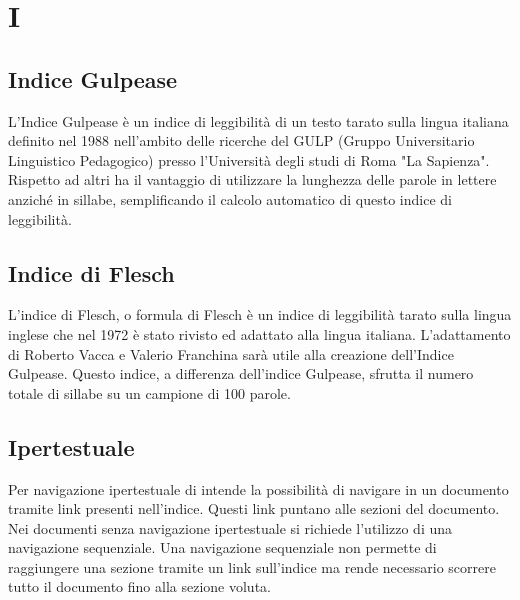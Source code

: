 \section{I}

    \subsection*{Indice Gulpease}

        L'Indice Gulpease è un indice di leggibilità di un testo tarato sulla lingua italiana definito nel 1988
        nell'ambito delle ricerche del GULP (Gruppo Universitario Linguistico Pedagogico) presso l'Università degli
        studi di Roma "La Sapienza". Rispetto ad altri ha il vantaggio di utilizzare la lunghezza delle parole in
        lettere anziché in sillabe, semplificando il calcolo automatico di questo indice di leggibilità.

    \subsection*{Indice di Flesch}

        L'indice di Flesch, o formula di Flesch è un indice di leggibilità tarato sulla lingua inglese che nel 1972 è
        stato rivisto ed adattato alla lingua italiana. L'adattamento di Roberto Vacca e Valerio Franchina sarà utile
        alla creazione dell'Indice Gulpease. Questo indice, a differenza dell'indice Gulpease, sfrutta il numero totale
        di sillabe su un campione di 100 parole.

    \subsection*{Ipertestuale}

        Per navigazione ipertestuale di intende la possibilità di navigare in un documento tramite link presenti
        nell'indice. Questi link puntano alle sezioni del documento.
        Nei documenti senza navigazione ipertestuale si richiede l'utilizzo di una navigazione sequenziale.
        Una navigazione sequenziale non permette di raggiungere una sezione tramite un link sull'indice ma rende
        necessario scorrere tutto il documento fino alla sezione voluta.